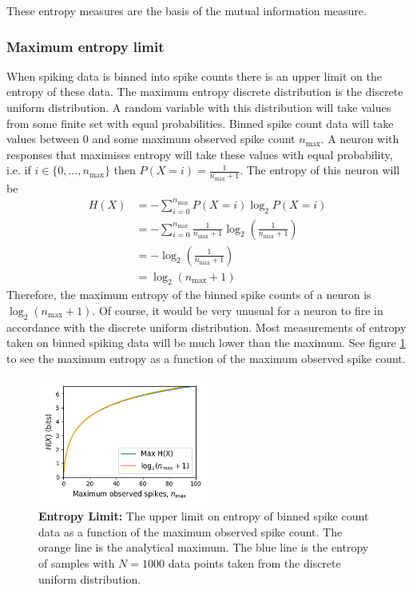         These entropy measures are the basis of the mutual information measure.

        \subsubsection{Maximum entropy limit}\label{sec:entropy_limit}
        When spiking data is binned into spike counts there is an upper limit on the entropy of these data. The maximum entropy discrete distribution is the discrete uniform distribution. A random variable with this distribution will take values from some finite set with equal probabilities. Binned spike count data will take values between $0$ and some maximum observed spike count $n_{\max}$. A neuron with responses that maximises entropy will take these values with equal probability, i.e. if $i \in \lbrace 0, \dots, n_{\max} \rbrace$ then $P(X = i) = \frac{1}{n_{\max} + 1}$. The entropy of this neuron will be
        \begin{align*}
          H(X)  &= - \sum_{i=0}^{n_{\max}} P(X = i) \log _2 P(X=i) \\
                &= - \sum_{i=0}^{n_{\max}} \frac{1}{n_{\max} + 1} \log_2 \left( \frac{1}{n_{\max} + 1} \right) \\
                &= - \log_2 \left( \frac{1}{n_{\max} + 1} \right) \\
                &= \log_2 \left( n_{\max} + 1 \right)
        \end{align*}
        Therefore, the maximum entropy of the binned spike counts of a neuron is $\log _2 \left( n_{\max} + 1 \right)$. Of course, it would be very unusual for a neuron to fire in accordance with the discrete uniform distribution. Most measurements of entropy taken on binned spiking data will be much lower than the maximum. See figure \ref{fig:entropy_limit} to see the maximum entropy as a function of the maximum observed spike count.

        \begin{figure}[h]
          \centering
          \includegraphics[width=0.5\textwidth]{figures/eight_probe/entropy_limit.png}
          \caption{\textbf{Entropy Limit:} The upper limit on entropy of binned spike count data as a function of the maximum observed spike count. The orange line is the analytical maximum. The blue line is the entropy of samples with $N=1000$ data points taken from the discrete uniform distribution.}
          \label{fig:entropy_limit}
        \end{figure}

